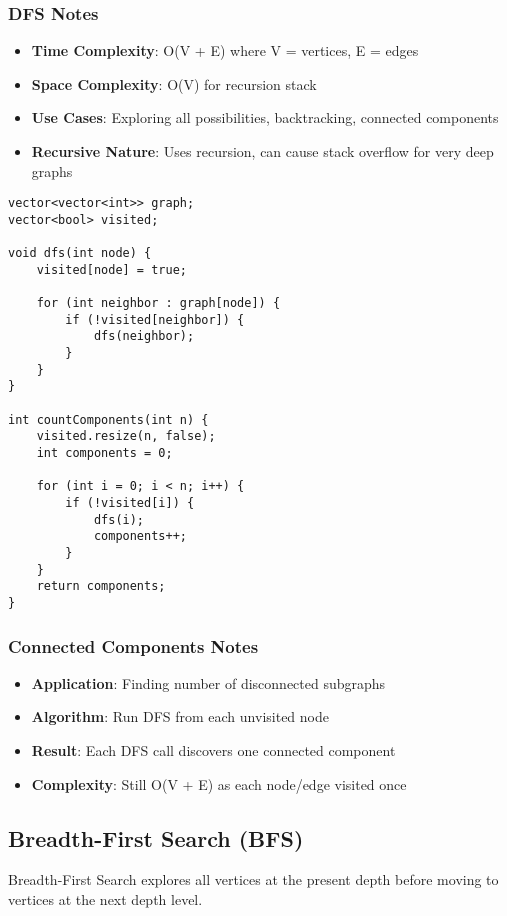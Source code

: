 \documentclass[11pt,a4paper]{article}
\begin{document}
\subsubsection*{DFS Notes}
\begin{itemize}
\item \textbf{Time Complexity}: O(V + E) where V = vertices, E = edges
\item \textbf{Space Complexity}: O(V) for recursion stack
\item \textbf{Use Cases}: Exploring all possibilities, backtracking, connected components
\item \textbf{Recursive Nature}: Uses recursion, can cause stack overflow for very deep graphs
\end{itemize}

\newpage
\begin{lstlisting}[caption={DFS with Connected Components}]
vector<vector<int>> graph;
vector<bool> visited;

void dfs(int node) {
    visited[node] = true;
    
    for (int neighbor : graph[node]) {
        if (!visited[neighbor]) {
            dfs(neighbor);
        }
    }
}

int countComponents(int n) {
    visited.resize(n, false);
    int components = 0;
    
    for (int i = 0; i < n; i++) {
        if (!visited[i]) {
            dfs(i);
            components++;
        }
    }
    return components;
}
\end{lstlisting}

\subsubsection*{Connected Components Notes}
\begin{itemize}
\item \textbf{Application}: Finding number of disconnected subgraphs
\item \textbf{Algorithm}: Run DFS from each unvisited node
\item \textbf{Result}: Each DFS call discovers one connected component
\item \textbf{Complexity}: Still O(V + E) as each node/edge visited once
\end{itemize}

\newpage
\subsection{Breadth-First Search (BFS)}
Breadth-First Search explores all vertices at the present depth before moving to vertices at the next depth level.
\end{document}
